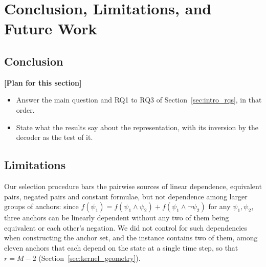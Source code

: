 \documentclass[titlepage,a4paper,11pt]{report}
\newenvironment{RSplan}{\par\medskip\color{orange!85!black}\noindent\textbf{[Plan for this section]}\par}{\par\medskip}
\begin{document}
\chapter{Conclusion, Limitations, and Future Work}\label{chap:conclusion}

    \section{Conclusion}
    \begin{RSplan}
    \begin{itemize}
        \item Answer the main question and RQ1 to RQ3 of Section~\ref{sec:intro_rqs}, in that order.
        \item State what the results say about the representation, with its inversion by the decoder as the test of it.
    \end{itemize}
    \end{RSplan}

    \section{Limitations} \label{sec:limitations}
    Our selection procedure bars the pairwise sources of linear dependence, equivalent pairs, negated pairs and constant formulae, but not dependence among larger groups of anchors: since $f(\psi_1)=f(\psi_1\land\psi_2)+f(\psi_1\land\neg\psi_2)$ for any $\psi_1,\psi_2$, three anchors can be linearly dependent without any two of them being equivalent or each other's negation. We did not control for such dependencies when constructing the anchor set, and the instance contains two of them, among eleven anchors that each depend on the state at a single time step, so that $r=M-2$ (Section~\ref{sec:kernel_geometry}).
\end{document}
